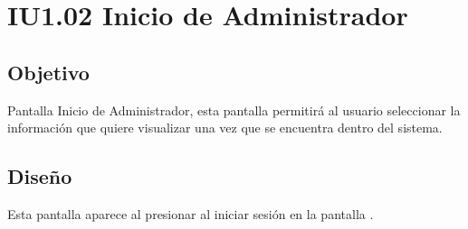 
\newpage
\section{IU1.02 Inicio de Administrador}

\subsection{Objetivo}
	Pantalla Inicio de Administrador, esta pantalla permitirá al usuario seleccionar la información que quiere visualizar una vez que se encuentra dentro del sistema.
	


\subsection{Diseño}
    Esta pantalla aparece al presionar al iniciar sesión en la pantalla .

	
